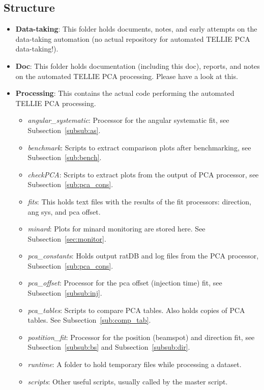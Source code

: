 \documentclass[12pt]{article}
\begin{document}
\subsection{Structure}
\begin{itemize}
	\item \textbf{Data-taking}: This folder holds documents, notes, and early attempts on the data-taking automation (no actual repository for automated TELLIE PCA data-taking!).
	\item \textbf{Doc}: This folder holds documentation (including this doc), reports, and notes on the automated TELLIE PCA processing. Please have a look at this.
	\item \textbf{Processing}: This contains the actual code performing the automated TELLIE PCA processing.
	\begin{itemize}
		\item \textit{angular\_systematic}: Processor for the angular systematic fit, see Subsection~\ref{subsub:as}.
		\item \textit{benchmark}: Scripts to extract comparison plots after benchmarking, see Subsection~\ref{sub:bench}.
		\item \textit{checkPCA}: Scripts to extract plots from the output of PCA processor, see Subsection~\ref{sub:pca_cons}.
		\item \textit{fits}: This holds text files with the results of the fit processors: direction, ang sys, and pca offset.
		\item \textit{minard}: Plots for minard monitoring are stored here. See Subsection~\ref{sec:monitor}.
		\item \textit{pca\_constants}: Holds output ratDB and log files from the PCA processor, Subsection~\ref{sub:pca_cons}.
		\item \textit{pca\_offset}: Processor for the pca offset (injection time) fit, see Subsection~\ref{subsub:inj}.
		\item \textit{pca\_tables}: Scripts to compare PCA tables. Also holds copies of PCA tables. See Subsection~\ref{sub:comp_tab}.
		\item \textit{postition\_fit}: Processor for the position (beamspot) and direction fit, see Subsection~\ref{subsub:bs} and Subsection~\ref{subsub:dir}.
		\item \textit{runtime}: A folder to hold temporary files while processing a dataset.
		\item \textit{scripts}: Other useful scripts, usually called by the master script.
		\begin{itemize}

\end{itemize}
\end{itemize}
\end{itemize}
\end{document}
